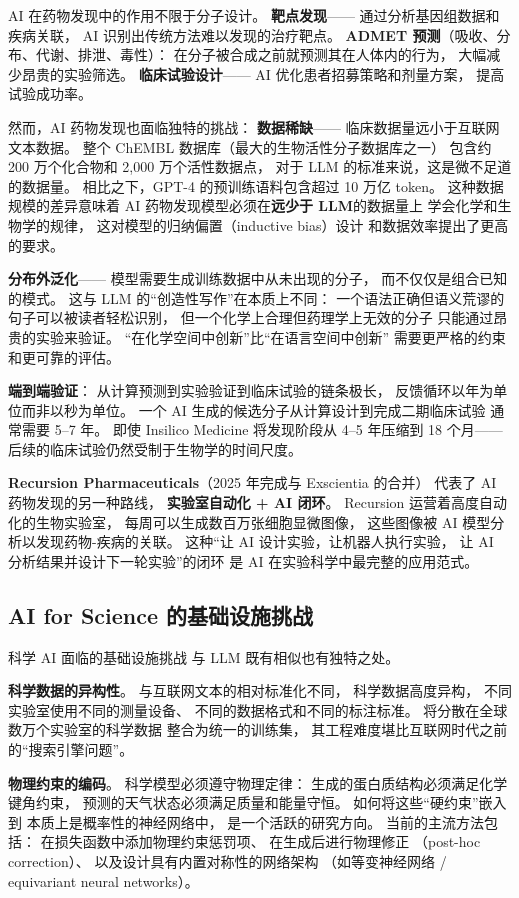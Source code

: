 AI 在药物发现中的作用不限于分子设计。
\textbf{靶点发现}——
通过分析基因组数据和疾病关联，
AI 识别出传统方法难以发现的治疗靶点。
\textbf{ADMET 预测}（吸收、分布、代谢、排泄、毒性）：
在分子被合成之前就预测其在人体内的行为，
大幅减少昂贵的实验筛选。
\textbf{临床试验设计}——
AI 优化患者招募策略和剂量方案，
提高试验成功率。

然而，AI 药物发现也面临独特的挑战：
\textbf{数据稀缺}——
临床数据量远小于互联网文本数据。
整个 ChEMBL 数据库（最大的生物活性分子数据库之一）
包含约 200 万个化合物和 2,000 万个活性数据点，
对于 LLM 的标准来说，这是微不足道的数据量。
相比之下，GPT-4 的预训练语料包含超过 10 万亿 token。
这种数据规模的差异意味着
AI 药物发现模型必须在\textbf{远少于 LLM}的数据量上
学会化学和生物学的规律，
这对模型的归纳偏置（inductive bias）设计
和数据效率提出了更高的要求。

\textbf{分布外泛化}——
模型需要生成训练数据中从未出现的分子，
而不仅仅是组合已知的模式。
这与 LLM 的“创造性写作”在本质上不同：
一个语法正确但语义荒谬的句子可以被读者轻松识别，
但一个化学上合理但药理学上无效的分子
只能通过昂贵的实验来验证。
“在化学空间中创新”比“在语言空间中创新”
需要更严格的约束和更可靠的评估。

\textbf{端到端验证}：
从计算预测到实验验证到临床试验的链条极长，
反馈循环以年为单位而非以秒为单位。
一个 AI 生成的候选分子从计算设计到完成二期临床试验
通常需要 5--7 年。
即使 Insilico Medicine 将发现阶段从 4--5 年压缩到 18 个月——
后续的临床试验仍然受制于生物学的时间尺度。

\textbf{Recursion Pharmaceuticals}（2025 年完成与 Exscientia 的合并）
代表了 AI 药物发现的另一种路线，
\textbf{实验室自动化 + AI 闭环}。
Recursion 运营着高度自动化的生物实验室，
每周可以生成数百万张细胞显微图像，
这些图像被 AI 模型分析以发现药物-疾病的关联。
这种“让 AI 设计实验，让机器人执行实验，
让 AI 分析结果并设计下一轮实验”的闭环
是 AI 在实验科学中最完整的应用范式。

\subsection{AI for Science 的基础设施挑战}

科学 AI 面临的基础设施挑战
与 LLM 既有相似也有独特之处。

\textbf{科学数据的异构性}。
与互联网文本的相对标准化不同，
科学数据高度异构，
不同实验室使用不同的测量设备、
不同的数据格式和不同的标注标准。
将分散在全球数万个实验室的科学数据
整合为统一的训练集，
其工程难度堪比互联网时代之前的“搜索引擎问题”。

\textbf{物理约束的编码}。
科学模型必须遵守物理定律：
生成的蛋白质结构必须满足化学键角约束，
预测的天气状态必须满足质量和能量守恒。
如何将这些“硬约束”嵌入到
本质上是概率性的神经网络中，
是一个活跃的研究方向。
当前的主流方法包括：
在损失函数中添加物理约束惩罚项、
在生成后进行物理修正
（post-hoc correction）、
以及设计具有内置对称性的网络架构
（如等变神经网络 / equivariant neural networks）。

